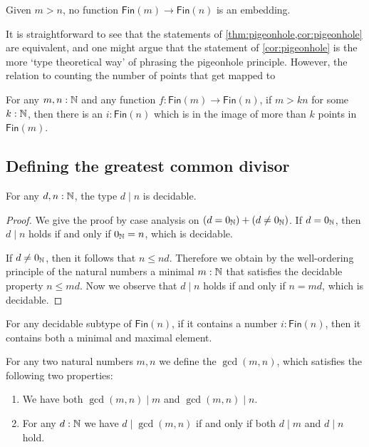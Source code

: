 \begin{cor}\label{cor:pigeonhole}
  Given $m>n$, no function $\mathsf{Fin}(m)\to\mathsf{Fin}(n)$ is an embedding.
\end{cor}

It is straightforward to see that the statements of \cref{thm:pigeonhole,cor:pigeonhole} are equivalent, and one might argue that the statement of \cref{cor:pigeonhole} is the more `type theoretical way' of phrasing the pigeonhole principle. However, the relation to counting the number of points that get mapped to 

\begin{thm}\label{thm:generalized-pigeonhole}
  For any $m,n:{\mathbb{N}}$ and any function $f:\mathsf{Fin}(m)\to\mathsf{Fin}(n)$, if $m>kn$ for some $k:{\mathbb{N}}$, then there is an $i:\mathsf{Fin}(n)$ which is in the image of more than $k$ points in $\mathsf{Fin}(m)$. 
\end{thm}

\subsection{Defining the greatest common divisor}

\begin{lem}
  For any $d,n:{\mathbb{N}}$, the type $d\mid n$ is decidable.
\end{lem}

\begin{proof}
  We give the proof by case analysis on $(d=0_{{\mathbb{N}}})+(d\neq0_{{\mathbb{N}}})$. If $d=0_{{\mathbb{N}}}$, then $d\mid n$ holds if and only if $0_{{\mathbb{N}}}=n$, which is decidable.

  If $d\neq0_{{\mathbb{N}}}$, then it follows that $n\leq nd$. Therefore we obtain by the well-ordering principle of the natural numbers a minimal $m:{\mathbb{N}}$ that satisfies the decidable property $n\leq md$. Now we observe that $d\mid n$ holds if and only if $n=md$, which is decidable.
\end{proof}

\begin{lem}
  For any decidable subtype of $\mathsf{Fin}(n)$, if it contains a number $i:\mathsf{Fin}(n)$, then it contains both a minimal and maximal element.
\end{lem}

\begin{defn}
  For any two natural numbers $m,n$ we define the  $\gcd(m,n)$, which satisfies the following two properties:
  \begin{enumerate}
  \item We have both $\gcd(m,n)\mid m$ and $\gcd(m,n)\mid n$.
  \item For any $d:{\mathbb{N}}$ we have $d\mid \gcd(m,n)$ if and only if both $d\mid m$ and $d\mid n$ hold.
  \end{enumerate}
\end{defn}

